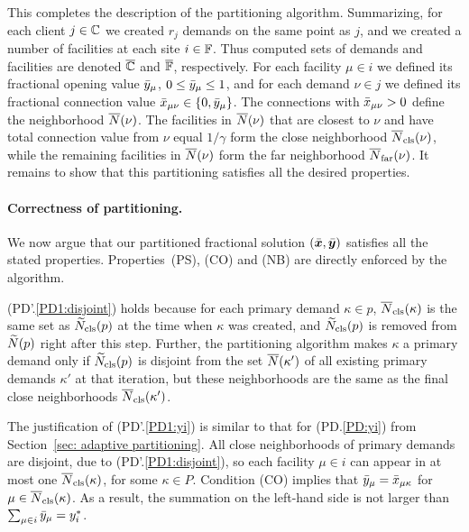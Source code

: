 \documentclass[oneside,final]{ucr}
\begin{document}
\medskip

This completes the description of the partitioning
algorithm. Summarizing, for each client $j\in\mathbb{C}$ we 
created $r_j$ demands on the same point as $j$, and we created a number
of facilities at each site $i\in\mathbb{F}$. Thus computed sets of
demands and facilities are denoted $\overline{\mathbb{C}}$ and $\overline{\mathbb{F}}$,
respectively.  For each facility $\mu\in i$ we defined its fractional
opening value ${\bar y}_\mu$, $0\le {\bar y}_\mu\le 1$, and for each demand
$\nu\in j$ we defined its fractional connection value
${\bar x}_{\mu\nu}\in { \left\{ 0,{\bar y}_\mu \right\} }$.  The connections with
${\bar x}_{\mu\nu} > 0$ define the neighborhood ${\overline{N}}(\nu)$. The facilities in
${\overline{N}}(\nu)$ that are closest to $\nu$ and have total connection value from $\nu$ equal
$1/\gamma$ form the close neighborhood ${\overline{N}}_{{\mbox{\scriptsize\rm cls}}}(\nu)$, while the remaining facilities
in ${\overline{N}}(\nu)$ form the far neighborhood
${\overline{N}}_{{\mbox{\scriptsize\rm far}}}(\nu)$. It remains to show that this partitioning satisfies all the desired
properties.


\medskip
\paragraph{Correctness of partitioning.}
We now argue that our partitioned fractional solution $(\bar{\boldsymbol{x}},\bar{\boldsymbol{y}})$
satisfies all the stated properties. Properties~(PS), (CO) and (NB) are
directly enforced by the algorithm.

(PD'.\ref{PD1:disjoint}) holds because for each primary demand
$\kappa\in p$, ${\overline{N}}_{{\mbox{\scriptsize\rm cls}}}(\kappa)$ is the same set as
${\widetilde N}_{{\mbox{\scriptsize\rm cls}}}(p)$ at the time when $\kappa$ was created, and
${\widetilde N}_{{\mbox{\scriptsize\rm cls}}}(p)$ is removed from ${\widetilde N}(p)$ right after this
step. Further, the partitioning algorithm makes $\kappa$ a primary
demand only if ${\widetilde N}_{{\mbox{\scriptsize\rm cls}}}(p)$ is disjoint from the set
${\overline{N}}(\kappa')$ of all existing primary demands $\kappa'$ at that
iteration, but these neighborhoods are the same as the final close
neighborhoods ${\overline{N}}_{{\mbox{\scriptsize\rm cls}}}(\kappa')$.

The justification of (PD'.\ref{PD1:yi}) is similar to that for
(PD.\ref{PD:yi}) from Section~\ref{sec: adaptive partitioning}. All
close neighborhoods of primary demands are disjoint, due to
(PD'.\ref{PD1:disjoint}), so each facility $\mu \in i$ can appear in
at most one ${\overline{N}}_{{\mbox{\scriptsize\rm cls}}}(\kappa)$, for some $\kappa\in P$. Condition
(CO) implies that ${\bar y}_{\mu} = {\bar x}_{\mu\kappa}$ for $\mu \in {\overline{N}}_{{\mbox{\scriptsize\rm cls}}}(\kappa)$.
As a result, the summation on
the left-hand side is not larger than $\sum_{\mu\in i}{\bar y}_{\mu} = y_i^\ast$.
\end{document}
